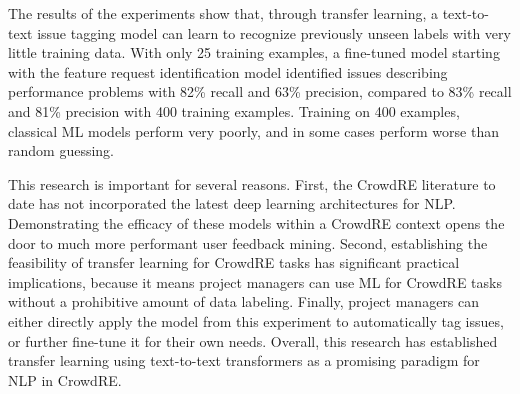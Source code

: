 The results of the experiments show that, through transfer learning, a text-to-text issue tagging model can learn to recognize previously unseen labels with very little training data. With only 25 training examples, a fine-tuned model starting with the feature request identification model identified issues describing performance problems with 82\% recall and 63\% precision, compared to 83\% recall and 81\% precision with 400 training examples. Training on 400 examples, classical ML models perform very poorly, and in some cases perform worse than random guessing.

This research is important for several reasons. First, the CrowdRE literature to date has not incorporated the latest deep learning architectures for NLP. Demonstrating the efficacy of these models within a CrowdRE context opens the door to much more performant user feedback mining. Second, establishing the feasibility of transfer learning for CrowdRE tasks has significant practical implications, because it means project managers can use ML for CrowdRE tasks without a prohibitive amount of data labeling. Finally, project managers can either directly apply the model from this experiment to automatically tag issues, or further fine-tune it for their own needs. Overall, this research has established transfer learning using text-to-text transformers as a promising paradigm for NLP in CrowdRE.